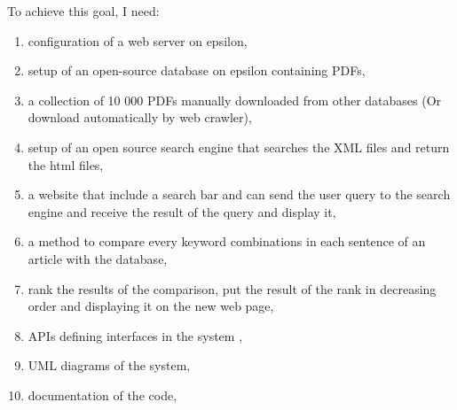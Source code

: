 	To achieve this goal, I need:
\begin{enumerate}
  \item configuration of a web server on epsilon,
  \item setup of an open-source database on epsilon containing PDFs,
  \item a collection of 10 000 PDFs manually downloaded from other databases (Or download automatically by web crawler),
  \item setup of an open source search engine that searches the XML files and return the html files,
  \item a website that include a search bar and can send the user query to the search engine and receive the result of the query and display it,
  \item a method to compare every keyword combinations in each sentence of an article with the database,
  \item rank the results of the comparison, put the result of the rank in decreasing order and displaying it on the new web page,
  \item APIs defining interfaces in the system ,
  \item UML diagrams of the system,
  \item documentation of the code, 
\end{enumerate}
